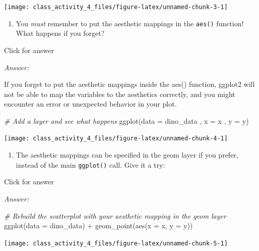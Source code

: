 \documentclass[
]{book}
\newenvironment{Shaded}{\begin{snugshade}}{\end{snugshade}}
\newcommand{\AttributeTok}[1]{\textcolor[rgb]{0.77,0.63,0.00}{#1}}
\newcommand{\CommentTok}[1]{\textcolor[rgb]{0.56,0.35,0.01}{\textit{#1}}}
\newcommand{\FunctionTok}[1]{\textcolor[rgb]{0.00,0.00,0.00}{#1}}
\newcommand{\NormalTok}[1]{#1}
\newcommand{\SpecialCharTok}[1]{\textcolor[rgb]{0.00,0.00,0.00}{#1}}
\providecommand{\tightlist}{%
  \setlength{\itemsep}{0pt}\setlength{\parskip}{0pt}}
\begin{document}
\texttt{[image: class\_activity\_4\_files/figure-latex/unnamed-chunk-3-1]}

\begin{enumerate}
\def\labelenumi{\alph{enumi}.}
\setcounter{enumi}{1}
\tightlist
\item
  You \emph{must} remember to put the aesthetic mappings in the \texttt{aes()} function! What happens if you forget?
\end{enumerate}

Click for answer

\emph{Answer:}

If you forget to put the aesthetic mappings inside the aes() function, ggplot2 will not be able to map the variables to the aesthetics correctly, and you might encounter an error or unexpected behavior in your plot.

\begin{Shaded}
\begin{Highlighting}[]
\CommentTok{\# Add a layer and see what happens}
\FunctionTok{ggplot}\NormalTok{(}\AttributeTok{data =}\NormalTok{ dino\_data , }\AttributeTok{x =}\NormalTok{ x , }\AttributeTok{y =}\NormalTok{ y)}
\end{Highlighting}
\end{Shaded}

\texttt{[image: class\_activity\_4\_files/figure-latex/unnamed-chunk-4-1]}

\begin{enumerate}
\def\labelenumi{\alph{enumi}.}
\setcounter{enumi}{2}
\tightlist
\item
  The aesthetic mappings can be specified in the geom layer if you prefer, instead of the main \texttt{ggplot()} call. Give it a try:
\end{enumerate}

Click for answer

\emph{Answer:}

\begin{Shaded}
\begin{Highlighting}[]
\CommentTok{\# Rebuild the scatterplot with your aesthetic mapping in the geom layer}
\FunctionTok{ggplot}\NormalTok{(}\AttributeTok{data =}\NormalTok{ dino\_data) }\SpecialCharTok{+}
   \FunctionTok{geom\_point}\NormalTok{(}\FunctionTok{aes}\NormalTok{(}\AttributeTok{x =}\NormalTok{ x, }\AttributeTok{y =}\NormalTok{ y)) }
\end{Highlighting}
\end{Shaded}

\texttt{[image: class\_activity\_4\_files/figure-latex/unnamed-chunk-5-1]}
\end{document}
